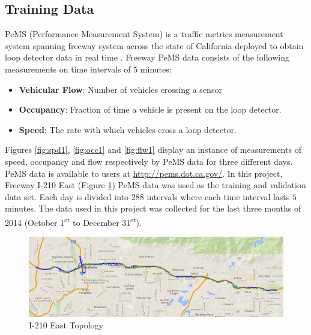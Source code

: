 \documentclass[twocolumn,10pt]{asme2e}
\begin{document}
\subsection{Training Data} 
PeMS (Performance Measurement System) is a traffic metrics measurement system spanning freeway system across the state of California deployed to obtain loop detector data in real time \cite{PemsPravin}. Freeway PeMS data consists of the following measurements on time intervals of $5$ minutes:
\begin{itemize}
\item[1]\textbf{Vehicular Flow}: Number of vehicles crossing a sensor 
\item[2]\textbf{Occupancy}: Fraction of time a vehicle is present on the loop detector\cite{occupancy}.
\item[3]\textbf{Speed}: The rate with which vehicles cross a loop detector.
\end{itemize}
Figures \ref{fig:spd1}, \ref{fig:occ1} and \ref{fig:flw1} display an instance of measurements of speed, occupancy and flow respectively by PeMS data for three different days. 
PeMS data is available to users at \url{http://pems.dot.ca.gov/}. In this project, Freeway I-210 East (Figure \ref{fig:210}) PeMS data was used as the training and validation data set. Each day is divided into 288 intervals where each time interval lasts $5$ minutes. The data used in this project was collected for the last three months of 2014 (October 1\textsuperscript{st} to December 31\textsuperscript{st}).
\begin{figure}[h]
    \centering
    \includegraphics[width=1\linewidth]{210.png}
    \caption{I-210 East Topology}
    \label{fig:210}
\end{figure} 
\end{document}

